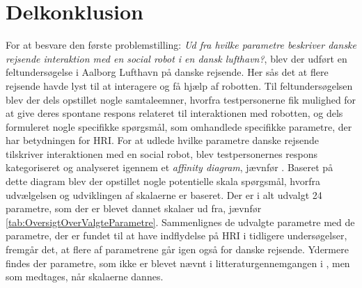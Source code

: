 \chapter{Delkonklusion}
\label{ParametreDelKonklusion}
%
For at besvare den første problemstilling: \textit{Ud fra hvilke parametre beskriver danske rejsende interaktion med en social robot i en dansk lufthavn?}, blev der udført en feltundersøgelse i Aalborg Lufthavn på danske rejsende. Her sås det at flere rejsende havde lyst til at interagere og få hjælp af robotten. Til feltundersøgelsen blev der dels opstillet nogle samtaleemner, hvorfra testpersonerne fik mulighed for at give deres spontane respons relateret til interaktionen med robotten, og dels formuleret nogle specifikke spørgsmål, som omhandlede specifikke parametre, der har betydningen for HRI. 
%
For at udlede hvilke parametre danske rejsende tilskriver interaktionen med en social robot, blev testpersonernes respons kategoriseret og analyseret igennem et \textit{affinity diagram}, jævnfør . Baseret på dette diagram blev der opstillet nogle potentielle skala spørgsmål, hvorfra udvælgelsen og udviklingen af skalaerne er baseret. Der er i alt udvalgt 24 parametre, som der er blevet dannet skalaer ud fra, jævnfør \autoref{tab:OversigtOverValgteParametre}. Sammenlignes de udvalgte parametre med de parametre, der er fundet til at have indflydelse på HRI i tidligere undersøgelser, fremgår det, at flere af parametrene går igen også for danske rejsende. Ydermere findes der parametre, som ikke er blevet nævnt i litteraturgennemgangen i , men som medtages, når skalaerne dannes.\blankline
%
